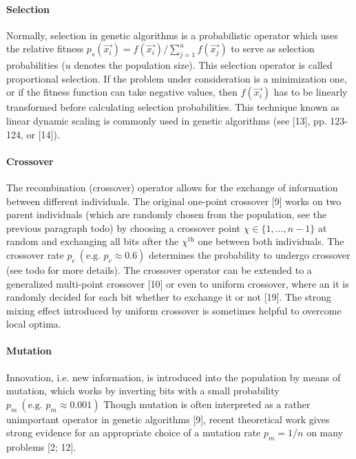 \documentclass[12pt]{article}
\begin{document}
\paragraph{Selection}
Normally, selection in genetic algorithms is a probabilistic operator
which uses the relative fitness 
$ p_s \left( \vec{x_i} \right) = 
f \left( \vec{x_i} \right) / \sum_{j=1}^uf \left( \vec{x_j} \right) $
to serve as selection probabilities
($u$ denotes the population size). This selection operator
is called proportional selection. If the problem under
consideration is a minimization one, or if the fitness
function can take negative values, then $ f \left( \vec{x_i} \right) $ has to be
linearly transformed before calculating selection probabilities.
This technique known as linear dynamic scaling is commonly used
in genetic algorithms (see [13], pp. 123-124, or [14]).

\paragraph{Crossover}
The recombination (crossover) operator allows for the
exchange of information between different individuals. The
original one-point crossover [9] works on two parent individuals
(which are randomly chosen from the population, see the previous paragraph todo)
by choosing a crossover point $ \chi \in \{1, \dots, n-1 \} $
at random and exchanging all bits after the $ \chi^{\text{th}} $ one
between both individuals. The crossover rate
$ p_c \ (\text{e.g. } p_c \approx 0.6) $
determines the probability to undergo crossover (see todo for more details).
The crossover operator can be extended to a generalized
multi-point crossover [10] or even to uniform crossover,
where an it is randomly decided for each bit
whether to exchange it or not [19]. The strong mixing effect
introduced by uniform crossover is sometimes helpful
to overcome local optima.

\paragraph{Mutation}
Innovation, i.e. new information, is introduced into the
population by means of mutation, which works by inverting
bits with a small probability
$ p_m \ (\text{e.g. } p_m \approx 0.001) $
Though mutation is often interpreted as a rather unimportant operator
in genetic algorithms [9], recent theoretical
work gives strong evidence for an appropriate choice of a
mutation rate $ p_m = 1/n $ on many problems [2; 12].
\end{document}
